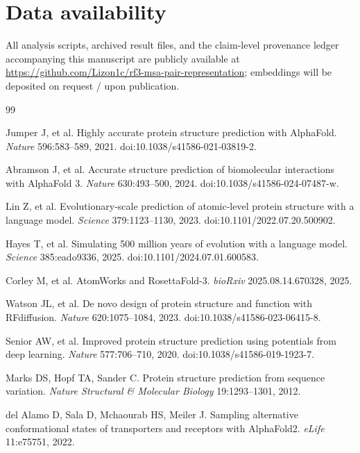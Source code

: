 \documentclass[11pt]{article}
\begin{document}
\section*{Data availability}

All analysis scripts, archived result files, and the claim-level provenance
ledger accompanying this manuscript are publicly available at
\url{https://github.com/Lizon1c/rf3-msa-pair-representation}; embeddings will
be deposited on request / upon publication.

\begin{thebibliography}{99}

Jumper J, et al.
\newblock Highly accurate protein structure prediction with AlphaFold.
\newblock \emph{Nature} 596:583--589, 2021.
\newblock doi:10.1038/s41586-021-03819-2.

Abramson J, et al.
\newblock Accurate structure prediction of biomolecular interactions with
AlphaFold 3.
\newblock \emph{Nature} 630:493--500, 2024.
\newblock doi:10.1038/s41586-024-07487-w.

Lin Z, et al.
\newblock Evolutionary-scale prediction of atomic-level protein structure with
a language model.
\newblock \emph{Science} 379:1123--1130, 2023.
\newblock doi:10.1101/2022.07.20.500902.

Hayes T, et al.
\newblock Simulating 500 million years of evolution with a language model.
\newblock \emph{Science} 385:eado9336, 2025.
\newblock doi:10.1101/2024.07.01.600583.

Corley M, et al.
\newblock AtomWorks and RosettaFold-3.
\newblock \emph{bioRxiv} 2025.08.14.670328, 2025.

Watson JL, et al.
\newblock De novo design of protein structure and function with RFdiffusion.
\newblock \emph{Nature} 620:1075--1084, 2023.
\newblock doi:10.1038/s41586-023-06415-8.

Senior AW, et al.
\newblock Improved protein structure prediction using potentials from deep
learning.
\newblock \emph{Nature} 577:706--710, 2020.
\newblock doi:10.1038/s41586-019-1923-7.

Marks DS, Hopf TA, Sander C.
\newblock Protein structure prediction from sequence variation.
\newblock \emph{Nature Structural \& Molecular Biology} 19:1293--1301, 2012.

del Alamo D, Sala D, Mchaourab HS, Meiler J.
\newblock Sampling alternative conformational states of transporters and
receptors with AlphaFold2.
\newblock \emph{eLife} 11:e75751, 2022.


\end{thebibliography}
\end{document}
